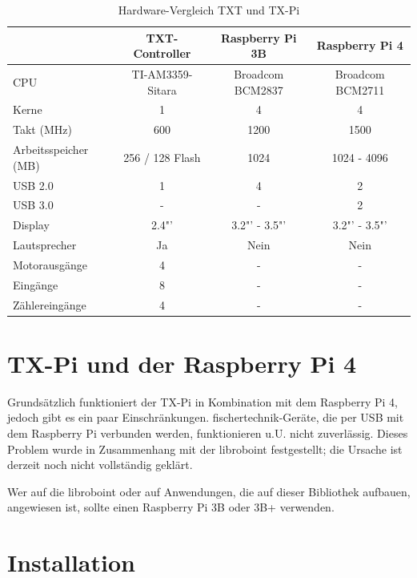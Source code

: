 \documentclass[
  paper=A4,
  ngerman,
  fontsize=12pt,
  parskip=half-,
]{scrbook}
\begin{document}
\begin{table}[ht]
\begin{tabular}{lccc}
                      & \textbf{TXT-Controller}   & \textbf{Raspberry Pi 3B}     & \textbf{Raspberry Pi 4} \\
\midrule
CPU                   & TI-AM3359-Sitara & Broadcom BCM2837    & Broadcom BCM2711 \\
Kerne                 & 1                & 4                   & 4 \\
Takt (MHz)            & 600              & 1200                & 1500 \\
Arbeitsspeicher (MB)  & 256 / 128 Flash  & 1024                & 1024 - 4096 \\
USB 2.0               & 1                & 4                   & 2 \\
USB 3.0               & -                & -                   & 2 \\
Display					 & 2.4"'              & 3.2"' - 3.5"'      & 3.2"' - 3.5"' \\
Lautsprecher          & Ja               & Nein                & Nein \\
Motorausgänge         & 4                & -                   & - \\
Eingänge              & 8                & -                   & - \\
Zählereingänge        & 4                & -                   & -
\end{tabular}
\caption{Hardware-Vergleich TXT und TX-Pi}
\label{tab:comparison}
\end{table}


\chapter{TX-Pi und der Raspberry Pi 4}\label{raspi-4}

Grundsätzlich funktioniert der TX-Pi in Kombination mit dem Raspberry Pi 4, jedoch gibt
es ein paar Einschränkungen. fischertechnik-Geräte, die per USB mit dem Raspberry Pi
verbunden werden, funktionieren u.U. nicht zuverlässig. Dieses Problem wurde in
Zusammenhang mit der libroboint festgestellt; die Ursache ist derzeit noch nicht
vollständig geklärt. 

Wer auf die libroboint oder auf Anwendungen, die auf dieser Bibliothek aufbauen,
angewiesen ist, sollte einen Raspberry Pi 3B oder 3B+ verwenden.


\chapter{Installation}
\end{document}
